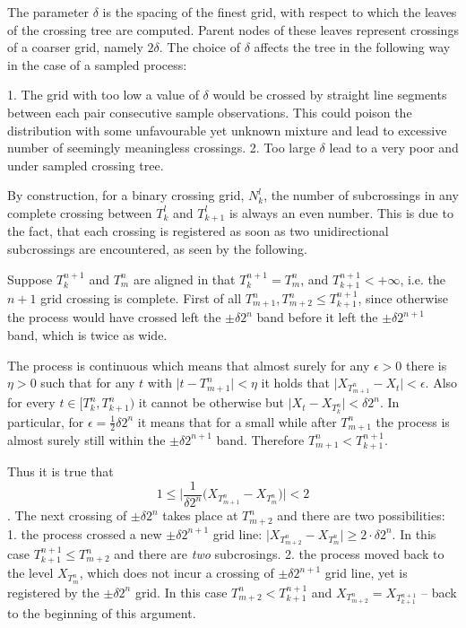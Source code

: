 \documentclass[a4paper]{report}
\begin{document}
The parameter $\delta$ is the spacing of the finest grid, with respect to which the leaves of the crossing tree are computed. Parent nodes of these leaves represent crossings of a coarser grid, namely $2\delta$. The choice of $\delta$ affects the tree in the following way in the case of a sampled process:

1. The grid with too low a value of $\delta$ would be crossed by straight line segments between each pair consecutive sample observations. This could poison the distribution with some unfavourable yet unknown mixture and lead to excessive number of seemingly meaningless crossings.
2. Too large $\delta$ lead to a very poor and under sampled crossing tree.

By construction, for a binary crossing grid, $N^l_k$, the number of subcrossings in any complete crossing between $T^l_k$ and $T^l_{k+1}$ is always an even number. This is due to the fact, that each crossing is registered as soon as two unidirectional subcrossings are encountered, as seen by the following.

Suppose $T^{n+1}_k$ and $T^n_m$ are aligned in that $T^{n+1}_k=T^n_m$, and $T^{n+1}_{k+1}<+\infty$, i.e. the $n+1$ grid crossing is complete. First of all $T^n_{m+1},T^n_{m+2}\leq T^{n+1}_{k+1}$, since otherwise the process would have crossed left the $\pm\delta 2^n$ band before it left the $\pm \delta 2^{n+1}$ band, which is twice as wide.

The process is continuous which means that almost surely for any $\epsilon>0$ there is $\eta>0$ such that for any $t$ with $\big|t-T^n_{m+1}\big| < \eta$ it holds that $\big |X_{T^n_{m+1}}-X_t\big|<\epsilon$.
Also for every $t\in\big[T^n_k, T^n_{k+1}\big)$ it cannot be otherwise but $\big | X_t - X_{T^n_k} \big | < \delta 2^n$. 
In particular, for $\epsilon = \frac{1}{2}\delta 2^n$ it means that for a small while after $T^n_{m+1}$ the process is almost surely still within the $\pm \delta 2^{n+1}$ band. Therefore $T^n_{m+1} < T^{n+1}_{k+1}$.

Thus it is true that $$1\leq \bigg | \frac{1}{\delta 2^n} \big(X_{T^n_{m+1}} - X_{T^n_m}\big)\bigg | < 2$$. The next crossing of $\pm\delta 2^n$ takes place at $T^n_{m+2}$ and there are two possibilities:
1. the process crossed a new $\pm\delta 2^{n+1}$ grid line: $\big|X_{T^n_{m+2}} - X_{T^n_m}\big|\geq 2\cdot\delta 2^n$. In this case $T^{n+1}_{k+1}\leq T^n_{m+2}$ and there are \emph{two} subcrosings.
2. the process moved back to the level $X_{T^n_m}$, which does not incur a crossing of $\pm\delta 2^{n+1}$ grid line, yet is registered by the $\pm\delta 2^n$ grid. In this case $T^n_{m+2} < T^{n+1}_{k+1}$ and $X_{T^n_{m+2}} = X_{T^{n+1}_{k+1}}$ -- back to the beginning of this argument.
\end{document}
